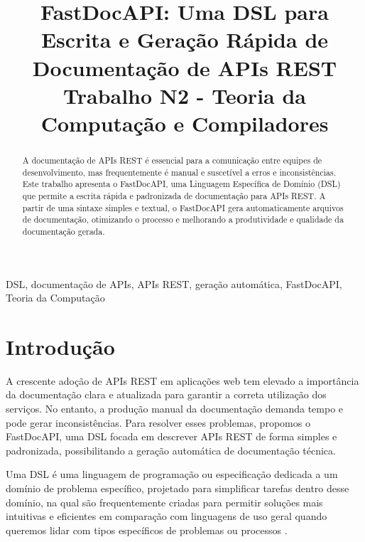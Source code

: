 \documentclass[conference]{IEEEtran}
\begin{document}
\title{FastDocAPI: Uma DSL para Escrita e Geração Rápida de Documentação de APIs REST\\
{\footnotesize Trabalho N2 - Teoria da Computação e Compiladores}
}

\author{
}

\maketitle

\begin{abstract}
A documentação de APIs REST é essencial para a comunicação entre equipes de desenvolvimento, mas frequentemente é manual e suscetível a erros e inconsistências. Este trabalho apresenta o FastDocAPI, uma Linguagem Específica de Domínio (DSL) que permite a escrita rápida e padronizada de documentação para APIs REST. A partir de uma sintaxe simples e textual, o FastDocAPI gera automaticamente arquivos de documentação, otimizando o processo e melhorando a produtividade e qualidade da documentação gerada.
\end{abstract}

\begin{IEEEkeywords}
DSL, documentação de APIs, APIs REST, geração automática, FastDocAPI, Teoria da Computação
\end{IEEEkeywords}

\section{Introdução}
A crescente adoção de APIs REST em aplicações web tem elevado a importância da documentação clara e atualizada para garantir a correta utilização dos serviços. No entanto, a produção manual da documentação demanda tempo e pode gerar inconsistências. Para resolver esses problemas, propomos o FastDocAPI, uma DSL focada em descrever APIs REST de forma simples e padronizada, possibilitando a geração automática de documentação técnica.

Uma DSL é uma linguagem de programação ou especificação dedicada a um domínio de problema específico, projetado para simplificar tarefas dentro desse domínio, na qual são frequentemente criadas para permitir soluções mais intuitivas e eficientes em comparação com linguagens de uso geral quando queremos lidar com tipos específicos de problemas ou processos \cite{jetbrainsDSL}.
\end{document}
